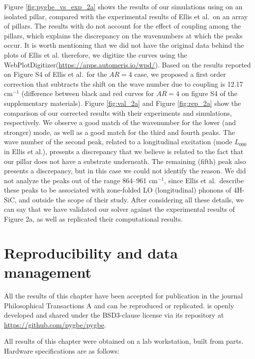 Figure \ref{fig:pygbe_vs_exp_2a} shows the results of our simulations using \pygbe on an isolated pillar, compared with the experimental results
of Ellis et al.\ on an array of pillars. The results with \pygbe do not account for the effect of coupling among the pillars, which explains the  
discrepancy on the wavenumbers at which the peaks occur. It is worth mentioning that we did not have the original data behind the plots of 
Ellis et al. therefore, we digitize the curves using the WebPlotDigitizer(\url{https://apps.automeris.io/wpd/}). Based on the results reported 
on Figure S4 of Ellis et al.\ for the $AR=4$ case, we proposed a first order correction that subtracts the shift on the wave number due to
coupling is 12.17 cm$^{-1}$ (difference between black and red curves for $AR=4$ on figure S4 of the supplementary materials). Figure \ref{fig:val_2a}
and Figure \ref{fig:rep_2a} show the comparison of our corrected results with their experiments and simulations, respectively. We observe a good match 
of the wavenumber for the lower (and stronger) mode, as well as a good match for the third and fourth peaks. The wave number of the second peak, related 
to a longitudinal excitation (mode $L_{000}$ in Ellis et al.), presents a discrepancy that we believe is related to the fact that our 
pillar does not have a substrate underneath. The remaining (fifth) peak also presents a discrepancy, but in this case we could not identify the reason.
We did not analyze the peaks out of the range 864--961 cm$^{-1}$, since Ellis et al.\ describe these peaks to be associated with 
zone-folded LO (longitudinal) phonons of 4H-SiC, and outside the scope of their study.
After considering all these details, we can say that we have validated our solver \pygbe against the experimental results of 
Figure 2a, as well as replicated their computational results.

\section{Reproducibility and data management} \label{sec:repro_val}
 
All the results of this chapter have been accepted for publication in the journal 
Philosophical Transactions A \cite{ClementiBarba2020} and can be reproduced or replicated. \pygbe is openly developed and 
shared under the BSD3-clause license via its repository at \url{https://github.com/pygbe/pygbe}.

All results of this chapter were obtained on a lab workstation, built from parts. Hardware specifications are as follows:

